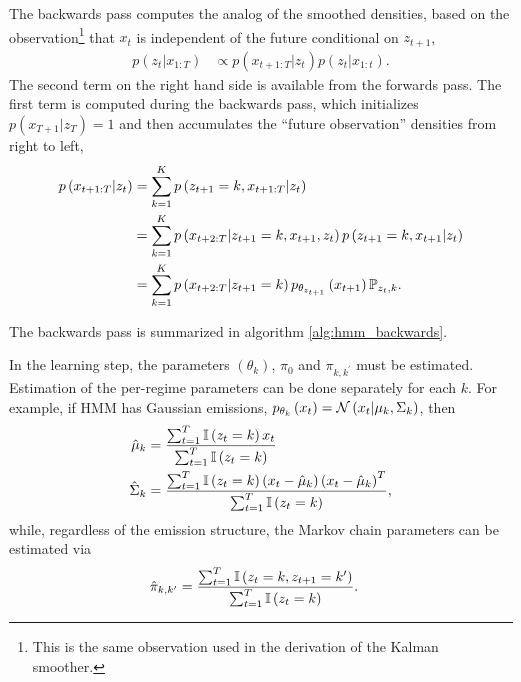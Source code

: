 \documentclass[14pt]{extreport}
\begin{document}
The backwards pass computes the analog of the smoothed densities, based on the
observation\footnote{This is the same observation used in the derivation of the
  Kalman smoother.} that $x_{t}$ is independent of the future conditional on
$z_{t + 1}$,
\begin{align*}
  p\left(z_{t} \vert x_{1:T}\right) &\propto p\left(x_{t + 1:T} \vert z_{t}\right) p\left(z_{t} \vert x_{1:t}\right).
\end{align*}
The second term on the right hand side is available from the forwards pass. The
first term is computed during the backwards pass, which initializes $p\left(x_{T
  + 1} \vert z_{T}\right) = 1$ and then accumulates the ``future observation''
densities from right to left,
\begin{align*}
  p\left(x_{t + 1: T} \vert z_{t}\right) &= \sum_{k = 1}^{K} p\left(z_{t + 1} = k, x_{t + 1 : T} \vert z_{t}\right) \\
  &= \sum_{k = 1}^{K} p\left(x_{t + 2: T}\vert z_{t + 1} = k, x_{t + 1}, z_{t}\right) p\left(z_{t + 1} = k, x_{t + 1} \vert z_{t}\right) \\
  &= \sum_{k = 1}^{K} p\left(x_{t + 2:T}\vert z_{t + 1} = k\right)p_{\theta_{z_{t + 1}}}\left(x_{t + 1}\right) \P_{z_{t}, k}.
\end{align*}

The backwards pass is summarized in algorithm \ref{alg:hmm_backwards}.

In the learning step, the parameters $\left(\theta_{k}\right)$, $\pi_0$ and
$\pi_{k, k^{\prime}}$ must be estimated. Estimation of the per-regime parameters
can be done separately for each $k$. For example, if HMM has Gaussian emissions,
$p_{\theta_{k}}\left(x_{t}\right) = \Gsn\left(x_{t} \vert \mu_{k},
\Sigma_{k}\right)$, then
\begin{align*}
  \hat{\mu}_{k} &= \frac{\sum_{t = 1}^{T} \indic{z_{t} = k}x_{t}}{\sum_{t = 1}^{T}\indic{z_{t} = k}} \\
  \hat{\Sigma}_{k} &= \frac{\sum_{t = 1}^{T} \indic{z_{t} = k}\left(x_{t} - \hat{\mu}_{k}\right)\left(x_{t} - \hat{\mu}_{k}\right)^{T}}
      {\sum_{t = 1}^{T} \indic{z_{t} = k}},
\end{align*}
while, regardless of the emission structure, the Markov chain parameters can be
estimated via
\begin{align*}
  \hat{\pi}_{k, k^{\prime}} &= \frac{\sum_{t = 1}^{T} \indic{z_{t} = k, z_{t + 1} = k^{\prime}}}{\sum_{t = 1}^{T} \indic{z_{t} = k}}.
\end{align*}
\end{document}
